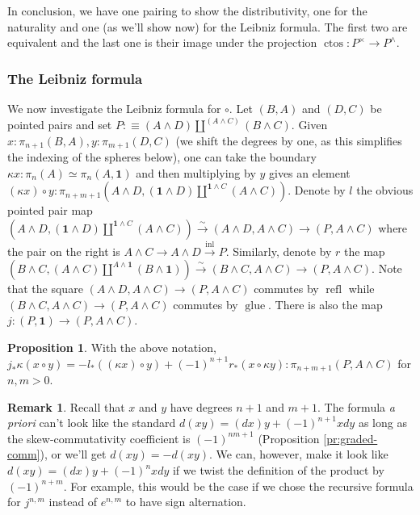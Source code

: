 \documentclass{amsart}
\theoremstyle{definition}
\newtheorem{prp}[theorem]{Proposition}
\newtheorem{re}[theorem]{Remark}
\newcommand{\refl}{\operatorname{refl}}
\newcommand{\inl}{\operatorname{inl}}
\newcommand{\glue}{\operatorname{glue}}
\newcommand{\sgtn}{\mathbf{1}}
\newcommand{\ctos}{\operatorname{ctos}}
\begin{document}
In conclusion, we have one pairing to show the distributivity, one for the naturality and one (as we'll show now) for the Leibniz formula. The first two are equivalent and the last one is their image under the projection $\ctos: P^\times \to P^\wedge$.

\subsubsection{The Leibniz formula}

We now investigate the Leibniz formula for $\circ$. Let $(B,A)$ and $(D,C)$ be pointed pairs and set $P :\equiv (A \wedge D) \coprod^{(A \wedge C)} (B \wedge C)$. Given $x : \pi_{n+1}(B,A), y : \pi_{m+1}(D,C)$ (we shift the degrees by one, as this simplifies the indexing of the spheres below), one can take the boundary $\kappa x : \pi_{n}(A) \simeq \pi_{n}(A,\sgtn)$ and then multiplying by $y$ gives an element $(\kappa x) \circ y : \pi_{n+m+1}(A \wedge D, (\sgtn \wedge D) \coprod^{\sgtn \wedge C} (A \wedge C) ).$
Denote by $l$ the obvious pointed pair map $(A \wedge D, (\sgtn \wedge D) \coprod^{\sgtn \wedge C} (A \wedge C) ) \xrightarrow{\sim} (A \wedge D, A \wedge C) \to (P, A \wedge C)$ where the pair on the right is $A \wedge C \to A \wedge D \xrightarrow{\inl} P$.
Similarly, denote by $r$ the map $(B \wedge C,  (A \wedge C) \coprod^{A \wedge \sgtn} (B \wedge \sgtn)) \xrightarrow{\sim} (B \wedge C, A \wedge C) \to (P, A \wedge C)$. Note that the square $(A \wedge D, A \wedge C) \to (P, A \wedge C)$ commutes by $\refl$ while $(B \wedge C, A \wedge C) \to (P, A \wedge C)$ commutes by $\glue$. There is also the map $j: (P, \sgtn) \to (P, A \wedge C)$.


\begin{prp}\label{4.1}
    With the above notation,
    $j_* \kappa (x \circ y) = -l_* ((\kappa x) \circ y) + (-1)^{n+1} r_* (x \circ \kappa y ): \pi_{n+m+1}(P, A \wedge C)$ for $n,m>0.$
\end{prp}

\begin{re}
    Recall that $x$ and $y$ have degrees $n+1$ and $m+1$. The formula \textit{a priori} can't look like the standard $d(xy) = (dx)y+(-1)^{n+1}xdy$ as long as the skew-commutativity coefficient is $(-1)^{nm+1}$ (Proposition \ref{pr:graded-comm}), or we'll get $d(xy) = -d(xy)$. We can, however, make it look like $d(xy) = (dx)y+(-1)^{n}xdy$ if we twist the definition of the product by $(-1)^{n+m}$. For example, this would be the case if we chose the recursive formula for $j^{n,m}$ instead of $e^{n,m}$ to have sign alternation.
\end{re}
\end{document}
